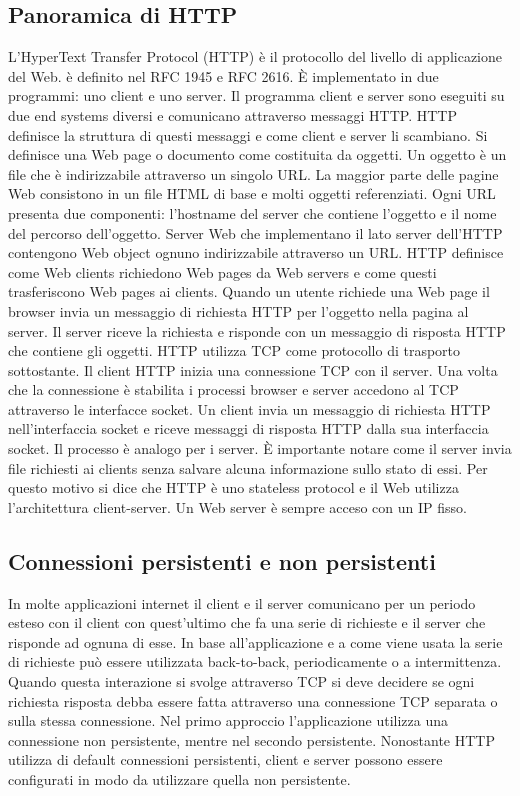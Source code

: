 \subsection{Panoramica di HTTP}
L'HyperText Transfer Protocol (HTTP) \`e il protocollo del livello di applicazione del Web. \`e definito nel RFC 1945 e RFC 2616. \`E implementato in due programmi: uno client e uno server. Il programma client
e server sono eseguiti su due end systems diversi e comunicano attraverso messaggi HTTP. HTTP definisce la struttura di questi messaggi e come client e server li scambiano. Si definisce una Web page
o documento come costituita da oggetti. Un oggetto \`e un file che \`e indirizzabile attraverso un singolo URL. La maggior parte delle pagine Web consistono in un file HTML di base e molti oggetti referenziati.
Ogni URL presenta due componenti: l'hostname del server che contiene l'oggetto e il nome del percorso dell'oggetto. Server Web che implementano il lato server dell'HTTP contengono Web object ognuno
indirizzabile attraverso un URL. HTTP definisce come Web clients richiedono Web pages da Web servers e come questi trasferiscono Web pages ai clients. Quando un utente richiede una Web page il browser
invia un messaggio di richiesta HTTP per l'oggetto nella pagina al server. Il server riceve la richiesta e risponde con un messaggio di risposta HTTP che contiene gli oggetti. HTTP utilizza TCP come protocollo di
trasporto sottostante. Il client HTTP inizia una connessione TCP con il server. Una volta che la connessione \`e stabilita i processi browser e server accedono al TCP attraverso le interfacce socket. Un client invia
un messaggio di richiesta HTTP nell'interfaccia socket e riceve messaggi di risposta HTTP dalla sua interfaccia socket. Il processo \`e analogo per i server. \`E importante notare come il server invia file richiesti
ai clients senza salvare alcuna informazione sullo stato di essi. Per questo motivo si dice che HTTP \`e uno stateless protocol e il Web utilizza l'architettura client-server. Un Web server \`e sempre acceso
con un IP fisso.
\subsection{Connessioni persistenti e non persistenti}
In molte applicazioni internet il client e il server comunicano per un periodo esteso con il client con quest'ultimo che fa una serie di richieste e il server che risponde ad ognuna di esse. In base all'applicazione
e a come viene usata la serie di richieste pu\`o essere utilizzata back-to-back, periodicamente o a intermittenza. Quando questa interazione si svolge attraverso TCP si deve decidere se ogni richiesta risposta 
debba essere fatta attraverso una connessione TCP separata o sulla stessa connessione. Nel primo approccio l'applicazione utilizza una connessione non persistente, mentre nel secondo persistente. 
Nonostante HTTP utilizza di default connessioni persistenti, client e server possono essere configurati in modo da utilizzare quella non persistente.
